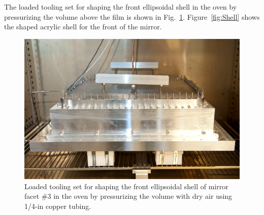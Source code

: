 The loaded tooling set for shaping the front ellipsoidal shell in the oven by pressurizing the volume above
the film is shown in  Fig.~\ref{fig:Pres_Shaping_Front}. Figure~\ref{fig:Shell} shows the shaped acrylic shell
for the front of the mirror.


\begin{figure}[ht]
    \centering
    \includegraphics[width=0.95\linewidth]{images/Pres_Shaping_Front.png}
    \caption{Loaded tooling set for shaping the front ellipsoidal shell of mirror facet \#3 in the oven by
      pressurizing the volume with dry air using 1/4-in copper tubing.}
    \label{fig:Pres_Shaping_Front}
\end{figure}

